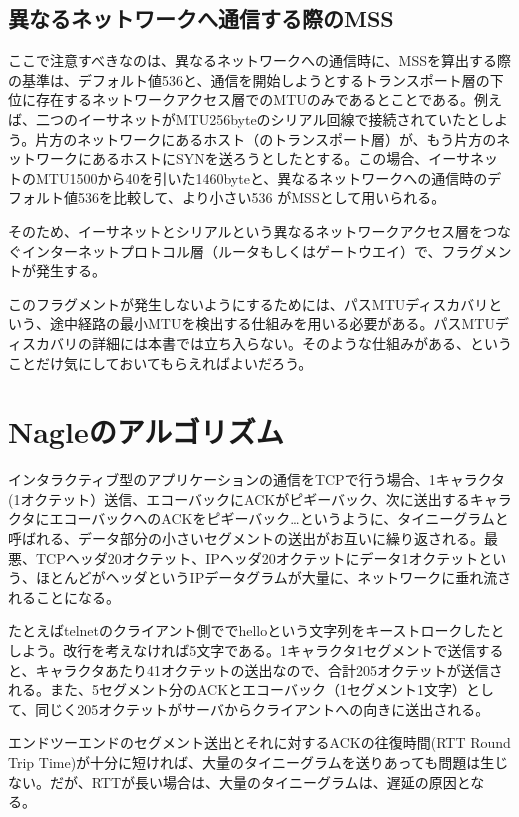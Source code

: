 \subsection{異なるネットワークへ通信する際のMSS}

ここで注意すべきなのは、異なるネットワークへの通信時に、MSSを算出する際の基準は、デフォルト値536と、通信を開始しようとするトランスポート層の下位に存在するネットワークアクセス層でのMTUのみであるとことである。例えば、二つのイーサネットがMTU256byteのシリアル回線で接続されていたとしよう。片方のネットワークにあるホスト（のトランスポート層）が、もう片方のネットワークにあるホストにSYNを送ろうとしたとする。この場合、イーサネットのMTU1500から40を引いた1460byteと、異なるネットワークへの通信時のデフォルト値536を比較して、より小さい536 がMSSとして用いられる。

そのため、イーサネットとシリアルという異なるネットワークアクセス層をつなぐインターネットプロトコル層（ルータもしくはゲートウエイ）で、フラグメントが発生する。

このフラグメントが発生しないようにするためには、パスMTUディスカバリという、途中経路の最小MTUを検出する仕組みを用いる必要がある。パスMTUディスカバリの詳細には本書では立ち入らない。そのような仕組みがある、ということだけ気にしておいてもらえればよいだろう。

\section{Nagleのアルゴリズム}

インタラクティブ型のアプリケーションの通信をTCPで行う場合、1キャラクタ(1オクテット）送信、エコーバックにACKがピギーバック、次に送出するキャラクタにエコーバックへのACKをピギーバック…というように、タイニーグラムと呼ばれる、データ部分の小さいセグメントの送出がお互いに繰り返される。最悪、TCPヘッダ20オクテット、IPヘッダ20オクテットにデータ1オクテットという、ほとんどがヘッダというIPデータグラムが大量に、ネットワークに垂れ流されることになる。

たとえばtelnetのクライアント側ででhelloという文字列をキーストロークしたとしよう。改行を考えなければ5文字である。1キャラクタ1セグメントで送信すると、キャラクタあたり41オクテットの送出なので、合計205オクテットが送信される。また、5セグメント分のACKとエコーバック（1セグメント1文字）として、同じく205オクテットがサーバからクライアントへの向きに送出される。

エンドツーエンドのセグメント送出とそれに対するACKの往復時間(RTT Round Trip Time)が十分に短ければ、大量のタイニーグラムを送りあっても問題は生じない。だが、RTTが長い場合は、大量のタイニーグラムは、遅延の原因となる。

